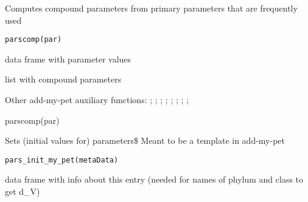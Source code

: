 \documentclass[a4paper]{book}
\begin{document}
%
\begin{Description}\relax
Computes compound parameters from primary parameters that are frequently used
\end{Description}
%
\begin{Usage}
\begin{verbatim}
parscomp(par)
\end{verbatim}
\end{Usage}
%
\begin{Arguments}
\begin{ldescription}
\item[\code{par}] data frame with parameter values
\end{ldescription}
\end{Arguments}
%
\begin{Value}
list with compound parameters
\end{Value}
%
\begin{SeeAlso}\relax
Other add-my-pet auxiliary functions: ;
; ;
; ;
;
;
; 
\end{SeeAlso}
%
\begin{Examples}
\begin{ExampleCode}
parscomp(par)
\end{ExampleCode}
\end{Examples}
%
\begin{Description}\relax
Sets (initial values for) parameters\$ Meant to be a template in add-my-pet
\end{Description}
%
\begin{Usage}
\begin{verbatim}
pars_init_my_pet(metaData)
\end{verbatim}
\end{Usage}
%
\begin{Arguments}
\begin{ldescription}
\item[\code{metaData}] data frame with info about this entry (needed for names of phylum and class to get d\_V)
\end{ldescription}
\end{Arguments}
\end{document}
